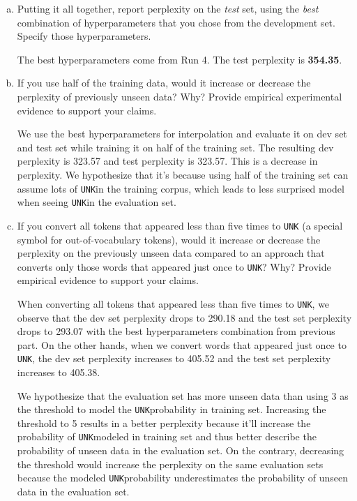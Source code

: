 \documentclass{article}
\newcommand*{\unk}{\texttt{UNK}}
\newenvironment{solution}{\color{blue}}{}
\begin{document}
\begin{enumerate}[(a)]
  \item Putting it all together, report perplexity on the \textit{test} set, 
  using the \textit{best} combination of hyperparameters that you chose from 
  the development set. Specify those hyperparameters.

  \begin{solution}
    The best hyperparameters come from Run 4. The test perplexity is \textbf{354.35}.
  \end{solution}
    
  \item If you use half of the training data, would it increase or decrease the 
  perplexity of previously unseen data? Why? Provide empirical experimental evidence 
  to support your claims.

  \begin{solution}
    We use the best hyperparameters for interpolation and evaluate it on dev set and 
    test set while training it on half of the training set. The resulting dev perplexity 
    is 323.57 and test perplexity is 323.57. This is a decrease in perplexity. We hypothesize
    that it's because using half of the training set can assume lots of \unk in the training 
    corpus, which leads to less surprised model when seeing \unk in the evaluation set.
  \end{solution}
    
  \item If you convert all tokens that appeared less than five times to \unk 
  (a special symbol for out-of-vocabulary tokens), would it increase or decrease 
  the perplexity on the previously unseen data compared to an approach that converts 
  only those words that appeared just once to \unk? Why? Provide empirical evidence 
  to support your claims.

  \begin{solution}
    When converting all tokens that appeared less than five times to \unk , we observe 
    that the dev set perplexity drops to 290.18 and the test set perplexity drops to 
    293.07 with the best hyperparameters combination from previous part. On the other 
    hands, when we convert words that appeared just once to \unk , the dev set perplexity 
    increases to 405.52 and the test set perplexity increases to 405.38.

    We hypothesize that the evaluation set has more unseen data than using 3 as the threshold to model 
    the \unk probability in training set. Increasing the threshold to 5 results in a better perplexity 
    because it'll increase the probability of \unk modeled in training set and thus better describe 
    the probability of unseen data in the evaluation set. On the contrary, decreasing the threshold
    would increase the perplexity on the same evaluation sets because the modeled \unk probability 
    underestimates the probability of unseen data in the evaluation set.

  \end{solution}
\end{enumerate}
\end{document}
